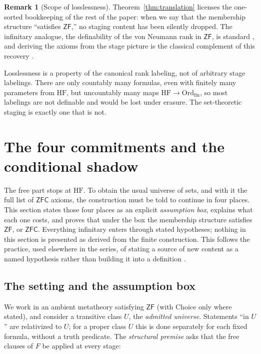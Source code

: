 \documentclass[11pt]{article}
\newcommand{\HF}{\mathrm{HF}}                 \newcommand{\rank}{\operatorname{rank}}
\newcommand{\Ord}{\mathrm{Ord}}
\theoremstyle{definition}
\newtheorem{remark}[theorem]{Remark}
\begin{document}
\begin{remark}[Scope of losslessness]\label{rem:translation}
Theorem~\ref{thm:translation} licenses the one-sorted bookkeeping of the rest of the paper: when
we say that the membership structure ``satisfies $\mathsf{ZF}$,'' no staging content has been
silently dropped. The infinitary analogue, the definability of the von Neumann rank in
$\mathsf{ZF}$, is standard \citep[Ch.~6]{Jech2003}, and deriving the axioms from the stage picture
is the classical complement of this recovery \citep{Scott1974,Boolos1971}.

Losslessness is a property of the canonical rank labeling, not of arbitrary stage labelings.
There are only countably many formulas, even with finitely many parameters from $\HF$, but
uncountably many maps $\HF\to\Ord_{\mathrm{fin}}$, so most labelings are not definable and would
be lost under erasure. The set-theoretic staging is exactly one that is not.
\end{remark}
 \section{The four commitments and the conditional shadow}\label{sec:purchases}

The free part stops at $\HF$. To obtain the usual universe of sets, and with it the full list of
$\mathsf{ZFC}$ axioms, the construction must be told to continue in four places. This section
states those four places as an explicit \emph{assumption box}, explains what each one costs, and
proves that under the box the membership structure satisfies $\mathsf{ZF}$, or $\mathsf{ZFC}$.
Everything infinitary enters through stated hypotheses; nothing in this section is presented as
derived from the finite construction. This follows the practice, used elsewhere in the series, of
stating a source of new content as a named hypothesis rather than building it into a definition
\citep{SBTRecognition,SBTIncompleteness}.

\subsection{The setting and the assumption box}\label{ssec:box}

We work in an ambient metatheory satisfying $\mathsf{ZF}$ (with Choice only where stated), and
consider a transitive class $U$, the \emph{admitted universe}. Statements ``in $U$'' are
relativized to $U$; for a proper class $U$ this is done separately for each fixed formula, without
a truth predicate. The \emph{structural premise} asks that the free clauses of $F$ be applied at
every stage:
\end{document}
